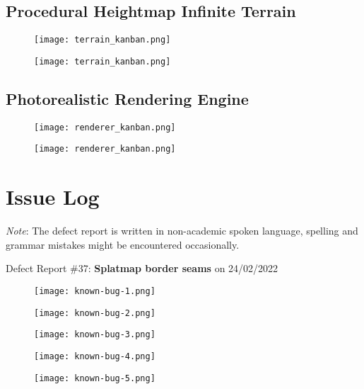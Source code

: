 \documentclass[oneside, a4paper]{report}
\begin{document}
    \section{Procedural Heightmap Infinite Terrain}

    \begin{figure}[H]
        \center
        \texttt{[image: terrain\_kanban.png]}
    \end{figure}

    \begin{figure}[H]
        \center
        \texttt{[image: terrain\_kanban.png]}
    \end{figure}

    \section{Photorealistic Rendering Engine}

    \begin{figure}[H]
        \center
        \texttt{[image: renderer\_kanban.png]}
    \end{figure}

    \begin{figure}[H]
        \center
        \texttt{[image: renderer\_kanban.png]}
    \end{figure}

    \chapter{Issue Log}
    \label{issue_log}

    \textit{Note}: The defect report is written in non-academic spoken language, spelling and grammar mistakes might be encountered occasionally.

    Defect Report \#37: \textbf{Splatmap border seams} on 24/02/2022

    \begin{figure}[H]
        \texttt{[image: known-bug-1.png]}
    \end{figure}

    \begin{figure}[H]
        \texttt{[image: known-bug-2.png]}
    \end{figure}

    \begin{figure}[H]
        \texttt{[image: known-bug-3.png]}
    \end{figure}
    
    \begin{figure}[H]
        \texttt{[image: known-bug-4.png]}
    \end{figure}

    \begin{figure}[H]
        \texttt{[image: known-bug-5.png]}
    \end{figure}
\end{document}
